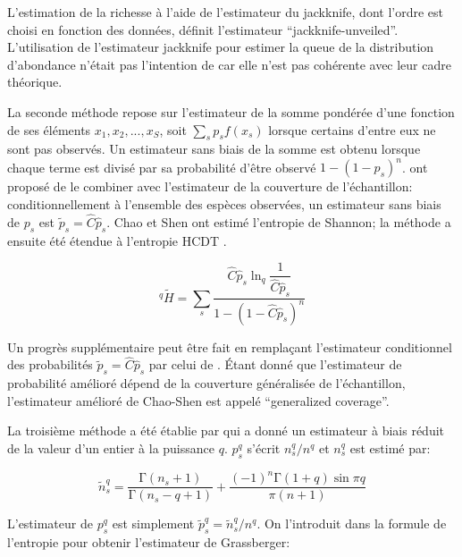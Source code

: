 \documentclass[
  11pt,
  american,
  a4paper,
  extrafontsizes,onecolumn,openright
  ]{memoir}
\begin{document}
L'estimation de la richesse à l'aide de l'estimateur du jackknife, dont l'ordre est choisi en fonction des données, définit l'estimateur \enquote{jackknife-unveiled}.
L'utilisation de l'estimateur jackknife pour estimer la queue de la distribution d'abondance n'était pas l'intention de \textcite{Chao2014c} car elle n'est pas cohérente avec leur cadre théorique.

La seconde méthode repose sur l'estimateur \textcite{Horvitz1952} de la somme pondérée d'une fonction de ses éléments \({x_1, x_2, ..., x_S}\), soit \(\sum_{s}{p_s f(x_s)}\) lorsque certains d'entre eux ne sont pas observés.
Un estimateur sans biais de la somme est obtenu lorsque chaque terme est divisé par sa probabilité d'être observé \(1-(1-p_s)^n\).
\textcite{Chao2003} ont proposé de le combiner avec l'estimateur de la couverture de l'échantillon: conditionnellement à l'ensemble des espèces observées, un estimateur sans biais \autocite{Ashbridge2000} de \(p_s\) est \(\tilde{p}_s = \hat{C} \hat{p}_s\).
Chao et Shen ont estimé l'entropie de Shannon; la méthode a ensuite été étendue à l'entropie HCDT \autocite{Marcon2014a}.

\begin{equation}
  ^{q}{\tilde{H}} 
  =\sum_{s}{\frac{
    \hat{C}{\hat{p}}_s \ln_q\dfrac{1}{\hat{C}{\hat{p}}_s}
  }{
    1 - {\left( 1 - \hat{C}{\hat{p}}_s \right)}^n}
  }
\end{equation}

Un progrès supplémentaire peut être fait en remplaçant l'estimateur conditionnel des probabilités \(\tilde{p}_s = \hat{C} \hat{p}_s\) par celui de \textcite{Chao2014c}.
Étant donné que l'estimateur de probabilité amélioré dépend de la couverture généralisée de l'échantillon, l'estimateur amélioré de Chao-Shen est appelé \enquote{generalized coverage}.

La troisième méthode a été établie par \textcite{Grassberger1988} qui a donné un estimateur à biais réduit de la valeur d'un entier à la puissance \(q\).
\({p_s^q}\) s'écrit \(n_s^q/n^q\) et \(n_s^q\) est estimé \autocite{Marcon2014a} par:

\begin{equation}
  \tilde{n}^{q}_{s}
  = \frac{\mathrm{\Gamma}\left(n_s + 1 \right)}{\mathrm{\Gamma}\left( n_s - q + 1 \right)} 
  + \frac{{\left( -1 \right)}^n \mathrm{\Gamma}\left( 1 + q \right)\sin{\pi q}}{\pi \left( n + 1 \right)}
\end{equation}

L'estimateur de \({p_s^q}\) est simplement \(\tilde{p}^{q}_{s} = \tilde{n}^{q}_{s}/n^q\).
On l'introduit dans la formule de l'entropie pour obtenir l'estimateur de Grassberger:
\end{document}
